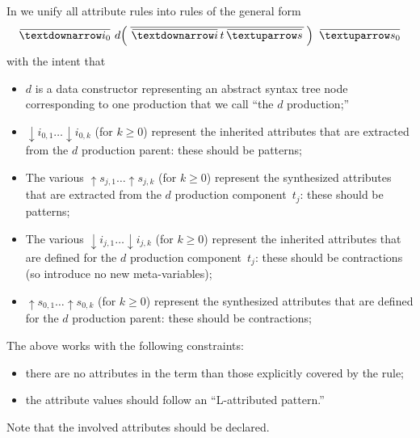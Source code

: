 \documentclass[11pt]{article} %
\begin{document}
In  we unify all attribute rules into rules of the general form
\begin{equation*}
  \ov{{↓}i_0}  ~ d\!\left(\,\ov{\, \ov{{↓}i} \, t \, \ov{{↑}s} \,}\,\right) ~ \ov{{↑}s_0}
  \label{eq:attributes}
\end{equation*}
with the intent that
\begin{itemize}

\item $d$ is a data constructor representing an abstract syntax tree node corresponding to one
  production that we call ``the $d$ production;''

\item ${↓}i_{0,1}…{↓}i_{0,k}$ (for $k≥0$) represent the inherited attributes that are extracted from
  the $d$ production parent: these should be patterns;

\item The various ${↑}s_{j,1}…{↑}s_{j,k}$ (for $k≥0$) represent the synthesized attributes that are
  extracted from the $d$ production component~$t_j$: these should be patterns;

\item The various ${↓}i_{j,1}…{↓}i_{j,k}$ (for $k≥0$) represent the inherited attributes that are
  defined for the $d$ production component~$t_j$: these should be contractions (so introduce no new
  meta-variables);

\item ${↑}s_{0,1}…{↑}s_{0,k}$ (for $k≥0$) represent the synthesized attributes that are defined for
  the $d$ production parent: these should be contractions;

\end{itemize}
The above works with the following constraints:
\begin{itemize}
\item there are no attributes in the term than those explicitly covered by the rule;
\item the attribute values should follow an ``L-attributed pattern.''
\end{itemize}
Note that the involved attributes should be declared.
\end{document}
